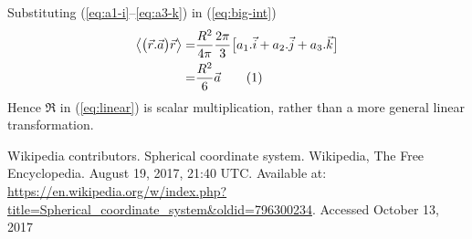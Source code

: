 \documentclass[]{article}
\newcommand\numberthis{\addtocounter{equation}{1}\tag{\theequation}}
\begin{document}
Substituting (\ref{eq:a1-i}--\ref{eq:a3-k})  in (\ref{eq:big-int})
\begin{align*}
\left\langle \big(\vec{r}.\vec{a}\big)\vec{r} \right\rangle=&\frac{ R^2}{4\pi}\frac{2\pi}{3}\big[a_1.\vec{i}+a_2.\vec{j}+a_3.\vec{k}\big]\\
=&\frac{R^2}{6}\vec{a} \numberthis \label{eq:final}
\end{align*}
Hence $\mathfrak{R}$ in (\ref{eq:linear}) is scalar multiplication, rather than a more general linear transformation.

\begin{thebibliography}{9}
	\raggedright
	Wikipedia contributors. Spherical coordinate system. Wikipedia, The Free Encyclopedia. August 19, 2017, 21:40 UTC. Available at: 
	\url{https://en.wikipedia.org/w/index.php?title=Spherical_coordinate_system&oldid=796300234}.
	Accessed
	October 13, 2017
\end{thebibliography}
\end{document}
